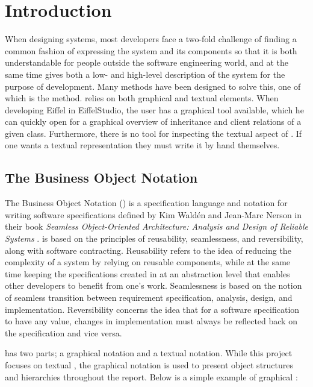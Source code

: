 \chapter{Introduction}
\label{sec:introduction}
When designing systems, most developers face a two-fold challenge of finding a common fashion of expressing the system and its components so that it is both understandable for people outside the software engineering world, and at the same time gives both a low- and high-level description of the system for the purpose of development. Many methods have been designed to solve this, one of which is the \bon{} method. \bon{} relies on both graphical and textual elements. When developing Eiffel in EiffelStudio, the user has a graphical \bon{} tool available, which he can quickly open for a graphical overview of inheritance and client relations of a given class. Furthermore, there is no tool for inspecting the textual aspect of \bon. If one wants a textual representation they must write it by hand themselves.

\section{The Business Object Notation}
The Business Object Notation (\bon{}) is a specification language and notation for writing software specifications defined by Kim Wald\'en and Jean-Marc Nerson in their book \textit{Seamless Object-Oriented Architecture: Analysis and Design of Reliable Systems} \cite{walden1995}. \bon{} is based on the principles of reusability, seamlessness, and reversibility, along with software contracting. Reusability refers to the idea of reducing the complexity of a system by relying on reusable components, while at the same time keeping the specifications created in \bon{} at an abstraction level that enables other developers to benefit from one's work. Seamlessness is based on the notion of seamless transition between requirement specification, analysis, design, and implementation. Reversibility concerns the idea that for a software specification to have any value, changes in implementation must always be reflected back on the specification and vice versa.

\bon{} has two parts; a graphical notation and a textual notation. While this project focuses on textual \bon{}, the graphical notation is used to present object structures and hierarchies throughout the report. Below is a simple example of graphical \bon{}:

